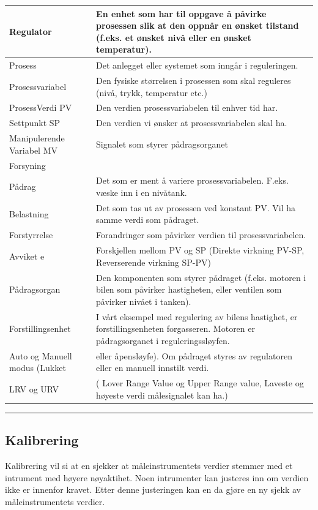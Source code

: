 \begin{center}
\begin{longtable}{ | m{2cm} | m{7cm} | }
Regulator & En enhet som har til oppgave å påvirke prosessen slik at den oppnår en ønsket tilstand (f.eks. et ønsket nivå eller en ønsket temperatur).\\
	\hline
Prosess & Det anlegget eller systemet som inngår i reguleringen.\\
	\hline
Prosessvariabel & Den fysiske størrelsen i prosessen som skal reguleres (nivå, trykk, temperatur etc.)\\
	\hline
ProsessVerdi PV & Den verdien prosessvariabelen til enhver tid har.\\
	\hline
Settpunkt SP & Den verdien vi ønsker at prosessvariabelen skal ha.\\
	\hline
Manipulerende Variabel MV & Signalet som styrer pådragsorganet\\
	\hline
Forsyning & \\
	\hline
Pådrag & Det som er ment å variere prosessvariabelen. F.eks. væske inn i en nivåtank. \\
	\hline
Belastning & Det som tas ut av prosessen ved konstant PV. Vil ha samme verdi som pådraget. \\
	\hline
Forstyrrelse & Forandringer som påvirker verdien til prosessvariabelen. \\
	\hline
Avviket e & Forskjellen mellom PV og SP (Direkte virkning PV-SP, Reverserende virkning SP-PV)\\
	\hline
Pådragsorgan & Den komponenten som styrer pådraget (f.eks. motoren i bilen som påvirker hastigheten, eller ventilen som påvirker nivået i tanken).\\
	\hline
Forstillingsenhet & I vårt eksempel med regulering av bilens hastighet, er forstillingsenheten forgasseren. Motoren er pådragsorganet i reguleringssløyfen.\\
	\hline
Auto og Manuell modus (Lukket& eller åpensløyfe). Om pådraget styres av regulatoren eller en manuell innstilt verdi. \\
	\hline
LRV og URV& ( Lover Range Value og Upper Range value, Laveste og høyeste verdi målesignalet kan ha.)\\

	\hline


\end{longtable}
\end{center}
\vskip 5pt
\hrule

\vskip 5pt
\subsection{Kalibrering}
Kalibrering vil si at en sjekker at måleinstrumentets verdier stemmer med et intrument med høyere nøyaktihet. Noen intrumenter kan justeres inn om verdien ikke er innenfor kravet. Etter denne justeringen kan en da gjøre en ny sjekk av måleinstrumentets verdier. 

